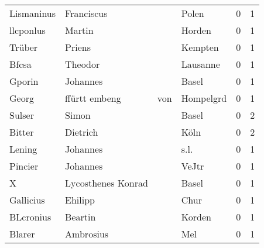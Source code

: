 \begin{tabular}{llllrr}
               Lismaninus &                         Franciscus &             &                                       Polen &          0 &         1 \\
                llcponlus &                             Martin &             &                                      Horden &          0 &         1 \\
                   Trüber &                             Priens &             &                                     Kempten &          0 &         1 \\
                    Bfcsa &                            Theodor &             &                                    Lausanne &          0 &         1 \\
                   Gporin &                           Johannes &             &                                       Basel &          0 &         1 \\
                    Georg &                      ffürtt embeng &         von &                                   Hompelgrd &          0 &         1 \\
                   Sulser &                              Simon &             &                                       Basel &          0 &         2 \\
                   Bitter &                           Dietrich &             &                                        Köln &          0 &         2 \\
                   Lening &                           Johannes &             &                                        s.l. &          0 &         1 \\
                  Pincier &                           Johannes &             &                                       VeJtr &          0 &         1 \\
                        X &                 Lycosthenes Konrad &             &                                       Basel &          0 &         1 \\
                Gallicius &                            Ehilipp &             &                                        Chur &          0 &         1 \\
                BLcronius &                            Beartin &             &                                      Korden &          0 &         1 \\
                   Blarer &                          Ambrosius &             &                                         Mel &          0 &         1 \\

\end{tabular}
